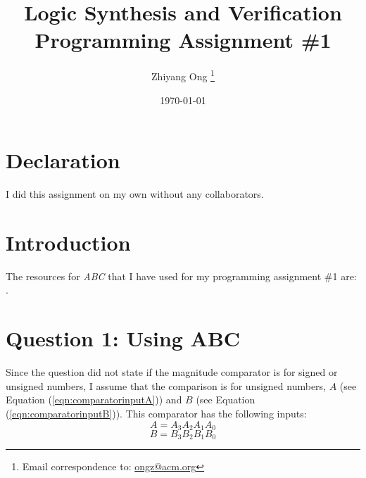\documentclass[letter,12pt]{article}
\begin{document}
\title{Logic Synthesis and Verification \\
Programming Assignment \#1}
\date{\today}
\author{Zhiyang Ong
	\thanks{Email correspondence to: \href{mailto:ongz@acm.org}{ongz@acm.org}}
}
\maketitle






\section*{Declaration}
\label{sec:declaration}

I did this assignment on my own without any collaborators. %










\section{Introduction}
\label{sec:intro}

The resources for {\it ABC} that I have used for my programming assignment \#1 are: \cite{Tu2013,BLSVG2011,Mishchenko20XY}.




\section{Question 1: Using ABC}
\label{sec:usingabc}

Since the question did not state if the magnitude comparator is for signed or unsigned numbers, I assume that the comparison is for unsigned numbers, $A$ (see Equation (\ref{eqn:comparatorinputA})) and $B$ (see Equation (\ref{eqn:comparatorinputB})). This comparator has the following inputs:
\begin{equation}
\label{eqn:comparatorinputA}
A = A_{3}A_{2}A_{1}A_{0}
\end{equation}
\begin{equation}
\label{eqn:comparatorinputB}
B = B_{3}B_{2}B_{1}B_{0}
\end{equation}
\end{document}
